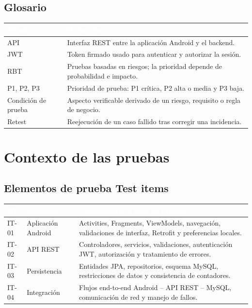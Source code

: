 \documentclass[11pt,a4paper]{article}
\newcommand{\thead}[1]{\textcolor{white}{\textbf{#1}}}
\begin{document}
\subsection{Glosario}
\begin{tabularx}{\textwidth}{p{2.2cm}Y}
\thead{Término} & \thead{Definición}\\
\midrule
API & Interfaz REST entre la aplicación Android y el backend.\\
JWT & Token firmado usado para autenticar y autorizar la sesión.\\
RBT & Pruebas basadas en riesgos; la prioridad depende de probabilidad e impacto.\\
P1, P2, P3 & Prioridad de prueba: P1 crítica, P2 alta o media y P3 baja.\\
Condición de prueba & Aspecto verificable derivado de un riesgo, requisito o regla de negocio.\\
Retest & Reejecución de un caso fallido tras corregir una incidencia.\\
\end{tabularx}

\section{Contexto de las pruebas}

\subsection{Elementos de prueba Test items}
\begin{tabularx}{\textwidth}{p{1.0cm}p{2.0cm}Y}
\thead{ID} & \thead{Elemento} & \thead{Componentes y foco de prueba}\\
\midrule
IT-01 & Aplicación Android & Activities, Fragments, ViewModels, navegación, validaciones de interfaz, Retrofit y preferencias locales.\\
IT-02 & API REST & Controladores, servicios, validaciones, autenticación JWT, autorización y tratamiento de errores.\\
IT-03 & Persistencia & Entidades JPA, repositorios, esquema MySQL, restricciones de datos y consistencia de contadores.\\
IT-04 & Integración & Flujos end-to-end Android -- API REST -- MySQL, comunicación de red y manejo de fallos.\\
\end{tabularx}
\end{document}
